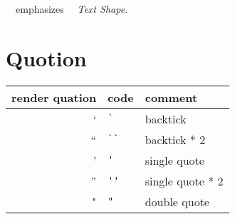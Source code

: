 \documentclass[a4paper,12pt]{article}
\begin{document}
\ \ emphasizes \quad \ \ \emph{Text Shape.}

\section*{Quotion}

\begin{tabular}{r|l|l}
	render quation & code      & comment          \\
	\hline
	`              & \verb|`|  & backtick         \\
	``             & \verb|``| & backtick * 2     \\
	'              & \verb|'|  & single quote     \\
	''             & \verb|''| & single quote * 2 \\
	"              & \verb|"|  & double quote     \\
\end{tabular} \\
\end{document}
